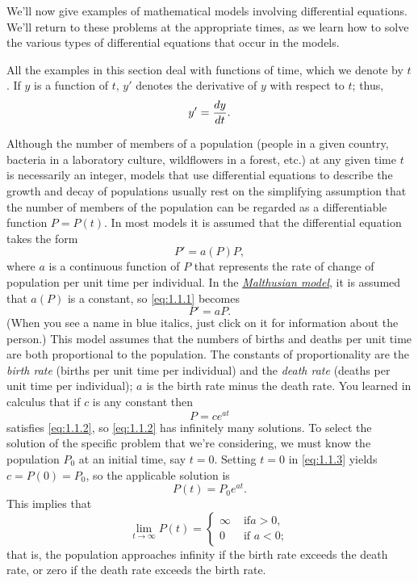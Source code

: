 \documentclass{ximera}
\begin{document}
We'll  now give  examples of mathematical models involving
differential equations. We'll return to these problems at the
appropriate times, as we learn how to solve the various types of
differential equations that occur in the models.

All the examples in this section deal with functions of time, which we
 denote by $t$. If $y$ is a function of $t$,  $y'$
denotes the derivative of $y$ with respect to $t$;   thus,
$$
y'={dy\over dt}.
$$


\noindent
Although the number of members of a population (people in a given
country, bacteria in a laboratory culture, wildflowers in a forest,
etc.)
at any given time $t$ is necessarily an integer, models that use
differential equations to describe the growth and decay of populations
usually rest on the simplifying assumption that the number of members of
the population can be regarded as a differentiable function $P=P(t)$.
In most models it is assumed that the differential equation takes the
form
\begin{equation} \label{eq:1.1.1}
P'=a(P)P,
\end{equation}
where $a$ is a continuous function of $P$ that represents the rate of
change of population per unit time per individual.
In the
\href{http://en.wikipedia.org/wiki/Thomas_Robert_Malthus}
{\color{blue}\it Malthusian model},
 it is assumed that
$a(P)$ is a constant, so \eqref{eq:1.1.1} becomes
\begin{equation} \label{eq:1.1.2}
P'=aP.
\end{equation}
\color{blue}
(When you see a name in blue italics, just click on it for
information about the person.)
\color{black}
This model assumes that the numbers of births and deaths per unit time
are both proportional to the population. The constants of
proportionality are  the {\color{blue}\it birth rate\/} (births per unit
time per individual) and the {\color{blue}\it death rate\/} (deaths per unit time
per individual);     $a$ is the birth rate minus the death rate.
You  learned in calculus that if $c$ is any constant then
\begin{equation} \label{eq:1.1.3}
P=ce^{at}
\end{equation}
satisfies \eqref{eq:1.1.2}, so \eqref{eq:1.1.2} has infinitely
many solutions. To select the solution of the specific problem that
we're considering, we must know the population $P_0$ at an initial
time, say $t=0$. Setting $t=0$ in \eqref{eq:1.1.3} yields
$c=P(0)=P_0$, so the applicable solution is
$$
P(t)=P_0e^{at}.
$$
This implies that
$$
\lim_{t\to\infty}P(t)=\left\{\begin{array}{cl}\infty&\mbox{ if
}a>0,\\ 0&\mbox{ if }a<0;    \end{array}\right.
$$
that is, the population approaches infinity if the birth rate exceeds
the death rate, or zero if the death rate exceeds the birth rate.
\end{document}
